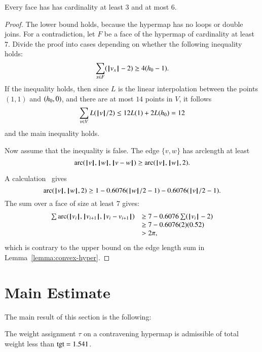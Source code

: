 \begin{lemma}  
Every face has has cardinality at least $3$ and at most $6$.
\end{lemma}

\begin{proof} The lower bound holds, because the hypermap has no loops or double joins.  For a contradiction, let $F$ be a face of the hypermap of cardinality at least $7$.  Divide the proof into cases depending on whether the
following inequality holds:
$$
\sum _{x\in F} (\normo{v_x}-2) \ge 4(\hm-1).
$$
If the inequality holds, then since $L$ is the linear interpolation between the points $(1,1)$ and $(\hm,0)$, and there are at most $14$ points in $V$, it follows
$$\sum_{v\in V}L(\normo{v}/2) \le 12 L(1) + 2 L(\hm) =12$$
and the main inequality holds.

Now assume that the inequality is false.
The edge $\{v,w\}$ has arclength at least
$$
\arc(\normo{v},\normo{w},\norm{v}{w}) \ge \arc(\normo{v},\normo{w},2). 
$$

A calculation~\cite[cc:arc]{hales:2009:nonlinear} gives
$$\arc(\normo{v},\normo{w},2)\ge 1 - 0.6076 (\normo{w}/2 - 1) - 0.6076 (\normo{v}/2 - 1).$$ %
The sum over a face of size at least $7$ gives:
$$
\begin{array}{lll}
\sum \arc(\normo{v_i},\normo{v_{i+1}},\norm{v_i}{v_{i+1}})&\ge
7 - 0.6076 \sum (\normo{v_i}-2) \\
   &\ge 7 - 0.6076 (2) (0.52) \\
   &> 2\pi,
\end{array}
$$
which is contrary to the upper bound on the edge length
sum in Lemma~\ref{lemma:convex-hyper}.
\end{proof}



\section{Main Estimate}\label{sec:weight}


The main result of this section is the following:

\begin{theorem}  %
The weight assignment $\tau$ on a contravening hypermap is admissible of  total weight less than $\op{tgt}=1.541$.
\end{theorem}

\label{sec:admissibility}




